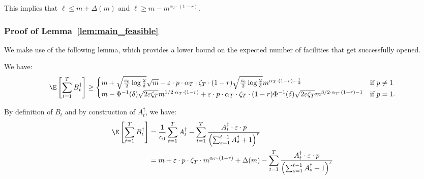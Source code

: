 \documentclass[blindrev]{informs3noheader}
\begin{document}
This implies that $\ell \leq m + \Delta(m)$ and $\ell\geq m-m^{\alpha_T\cdot(1-r)}$.
\hfill\Halmos

\subsubsection{Proof of Lemma~\ref{lem:main_feasible}}

We make use of the following lemma, which provides a lower bound on the expected number of facilities that get successfully opened.

\begin{lemma}\label{lem:main_bound}
We have:
\begin{align*}
    \E\left[\sum_{t=1}^T B^\dagger_t\right] \geq \begin{cases}
        m + \sqrt{\frac{c_0}{2}\log \frac{2}{\delta}}\sqrt{m} - \varepsilon\cdot p\cdot \alpha_T\cdot\zeta_T\cdot(1-r)\sqrt{\frac{c_0}{2}\log \frac{2}{\delta}}m^{\alpha_T\cdot (1-r)-\frac{1}{2}} & \text{if }p\neq1\\
         m - \Phi^{-1}(\delta) \sqrt{2\varepsilon \zeta_T} m^{1/2 \cdot \alpha_T \cdot (1-r)} + \varepsilon\cdot p\cdot \alpha_T\cdot\zeta_T\cdot(1-r)\Phi^{-1}(\delta) \sqrt{2\varepsilon \zeta_T} m^{3/2 \cdot \alpha_T \cdot (1-r)-1} & \text{if }p=1.
    \end{cases}
\end{align*}
\end{lemma}

By definition of $B_t$ and by construction of $A^\dagger_t$, we have:
\begin{align*}
\E\left[\sum_{t=1}^T B^\dagger_t\right] & =  \frac{1}{c_0}\sum_{t=1}^T A^\dagger_t - 
    \sum_{t=1}^T \frac{A^\dagger_t\cdot \varepsilon\cdot p }{\left(\sum_{s=1}^{t-1} A^\dagger_s +1\right)^r}\\
    & = m + \varepsilon\cdot p\cdot\zeta_T\cdot m^{\alpha_T\cdot(1-r)} + \Delta(m)
     - \sum_{t=1}^T \frac{A^\dagger_t\cdot \varepsilon\cdot p}{\left(\sum_{s=1}^{t-1} A^\dagger_s +1\right)^r}
\end{align*}
\end{document}
